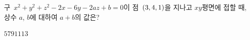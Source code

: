 구~$x^2+y^2+z^2-2x-6y-2az+b=0$이 점~$(3{,}\mkern3mu\mathopen{}4{,}\mkern3mu\mathopen{}1)$을 지나고 $xy$평면에 접할 때, 상수 $a$, $b$에 대하여 $a+b$의 값은?
\begin{choices32}{$5$}{$7$}{$9$}{$11$}{$13$}\end{choices32}
